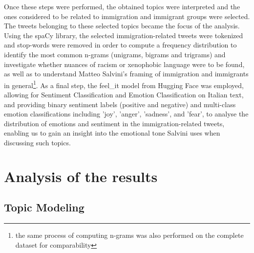 \documentclass[11pt]{article}
\begin{document}
Once these steps were performed, the obtained topics were interpreted and the ones considered to be related to immigration and immigrant groups were selected. The tweets belonging to these selected topics became the focus of the analysis.
Using the spaCy \citep{spacy2} library, the selected immigration-related tweets were tokenized and stop-words were removed in order to compute a frequency distribution to identify the most common n-grams (unigrams, bigrams and trigrams) and investigate whether nuances of racism or xenophobic language were to be found, as well as to understand Matteo Salvini's framing of immigration and immigrants in general\footnote{the same process of computing n-grams was also performed on the complete dataset for comparability}. As a final step, the feel\_it model \citep{bianchi2021feel} from Hugging Face was employed, allowing for Sentiment Classification and Emotion Classification on Italian text, and providing binary sentiment labels (positive and negative) and multi-class emotion classifications including ’joy’, ’anger’, ’sadness’, and ’fear’, to analyse the distribution of emotions and sentiment in the immigration-related tweets, enabling us to gain an insight into the emotional tone Salvini uses when discussing such topics. 


\section{Analysis of the results}

\subsection{Topic Modeling}
\end{document}
